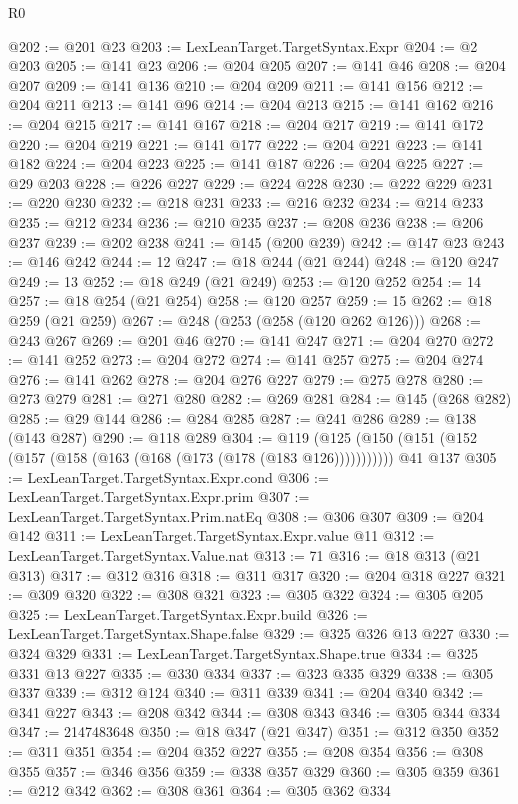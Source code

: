 \begin{lexlean}{R0}
\begin{coremodule}
@202 := @201 @23
@203 := LexLeanTarget.TargetSyntax.Expr
@204 := @2 @203
@205 := @141 @23
@206 := @204 @205
@207 := @141 @46
@208 := @204 @207
@209 := @141 @136
@210 := @204 @209
@211 := @141 @156
@212 := @204 @211
@213 := @141 @96
@214 := @204 @213
@215 := @141 @162
@216 := @204 @215
@217 := @141 @167
@218 := @204 @217
@219 := @141 @172
@220 := @204 @219
@221 := @141 @177
@222 := @204 @221
@223 := @141 @182
@224 := @204 @223
@225 := @141 @187
@226 := @204 @225
@227 := @29 @203
@228 := @226 @227
@229 := @224 @228
@230 := @222 @229
@231 := @220 @230
@232 := @218 @231
@233 := @216 @232
@234 := @214 @233
@235 := @212 @234
@236 := @210 @235
@237 := @208 @236
@238 := @206 @237
@239 := @202 @238
@241 := @145 (@200 @239)
@242 := @147 @23
@243 := @146 @242
@244 := 12
@247 := @18 @244 (@21 @244)
@248 := @120 @247
@249 := 13
@252 := @18 @249 (@21 @249)
@253 := @120 @252
@254 := 14
@257 := @18 @254 (@21 @254)
@258 := @120 @257
@259 := 15
@262 := @18 @259 (@21 @259)
@267 := @248 (@253 (@258 (@120 @262 @126)))
@268 := @243 @267
@269 := @201 @46
@270 := @141 @247
@271 := @204 @270
@272 := @141 @252
@273 := @204 @272
@274 := @141 @257
@275 := @204 @274
@276 := @141 @262
@278 := @204 @276 @227
@279 := @275 @278
@280 := @273 @279
@281 := @271 @280
@282 := @269 @281
@284 := @145 (@268 @282)
@285 := @29 @144
@286 := @284 @285
@287 := @241 @286
@289 := @138 (@143 @287)
@290 := @118 @289
@304 := @119
    (@125 (@150 (@151 (@152 (@157 (@158 (@163 (@168 (@173 (@178 (@183 @126)))))))))))
    @41
    @137
@305 := LexLeanTarget.TargetSyntax.Expr.cond
@306 := LexLeanTarget.TargetSyntax.Expr.prim
@307 := LexLeanTarget.TargetSyntax.Prim.natEq
@308 := @306 @307
@309 := @204 @142
@311 := LexLeanTarget.TargetSyntax.Expr.value @11
@312 := LexLeanTarget.TargetSyntax.Value.nat
@313 := 71
@316 := @18 @313 (@21 @313)
@317 := @312 @316
@318 := @311 @317
@320 := @204 @318 @227
@321 := @309 @320
@322 := @308 @321
@323 := @305 @322
@324 := @305 @205
@325 := LexLeanTarget.TargetSyntax.Expr.build
@326 := LexLeanTarget.TargetSyntax.Shape.false
@329 := @325 @326 @13 @227
@330 := @324 @329
@331 := LexLeanTarget.TargetSyntax.Shape.true
@334 := @325 @331 @13 @227
@335 := @330 @334
@337 := @323 @335 @329
@338 := @305 @337
@339 := @312 @124
@340 := @311 @339
@341 := @204 @340
@342 := @341 @227
@343 := @208 @342
@344 := @308 @343
@346 := @305 @344 @334
@347 := 2147483648
@350 := @18 @347 (@21 @347)
@351 := @312 @350
@352 := @311 @351
@354 := @204 @352 @227
@355 := @208 @354
@356 := @308 @355
@357 := @346 @356
@359 := @338 @357 @329
@360 := @305 @359
@361 := @212 @342
@362 := @308 @361
@364 := @305 @362 @334

\end{coremodule}
\end{lexlean}
